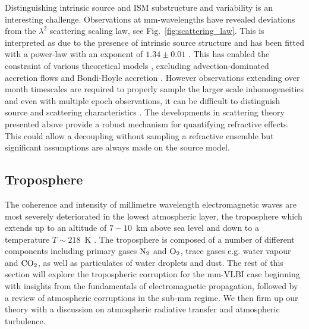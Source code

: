 Distinguishing intrinsic source and ISM substructure and variability is an interesting challenge. Observations at mm-wavelengths have revealed deviations from the $\lambda^2$ scattering scaling law, see Fig.~\ref{fig:scattering_law}. This is interpreted as due to the presence of intrinsic source structure and has been fitted with a power-law with an exponent of $1.34 \pm 0.01$ \citep{Lu_2011}. This has enabled the constraint of various theoretical models \cite{Bower_2006}, excluding advection-dominated accretion flows \citep[(ADAF),][]{Narayan_1995} and Bondi-Hoyle accretion \citep{Melia_1994}. However observations extending over month timescales are required to properly sample the larger scale inhomogeneities and even with multiple epoch observations, it can be difficult to distinguish source and scattering characteristics \citep*{Macquart_2006}. The developments in scattering theory presented above provide a robust mechanism for quantifying refractive effects. This could allow a decoupling without sampling a refractive ensemble but significant assumptions are always made on the source model. 


\subsection{Troposphere}\label{sec:trop}

The coherence and intensity of millimetre wavelength electromagnetic waves are most severely deteriorated in the lowest atmospheric layer, the troposphere which extends up to an altitude of $7-10$~km above sea level and down to a temperature $T \sim 218$~K \citep{Thompson_2001}. The troposphere is composed of a number of different components including primary gases $\rm N_2$ and  $\rm O_2$, trace gases e.g. water vapour and ${\rm CO_2}$, as well as particulates of water droplets and dust. The rest of this section will explore the tropospheric corruption for the mm-VLBI case beginning with insights from the fundamentals of electromagnetic propagation, followed by a review of atmospheric corruptions in the sub-mm regime. We then firm up our theory with a discussion on atmospheric radiative transfer and atmospheric turbulence. 


